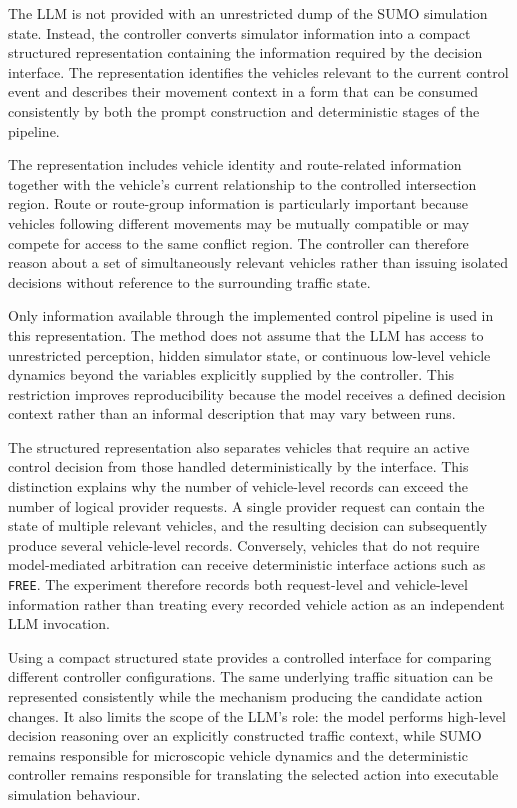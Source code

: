 \documentclass[letterpaper,10pt,conference]{ieeeconf}
\begin{document}
The LLM is not provided with an unrestricted dump of the SUMO simulation state. Instead, the controller converts simulator information into a compact structured representation containing the information required by the decision interface. The representation identifies the vehicles relevant to the current control event and describes their movement context in a form that can be consumed consistently by both the prompt construction and deterministic stages of the pipeline.



The representation includes vehicle identity and route-related information together with the vehicle's current relationship to the controlled intersection region. Route or route-group information is particularly important because vehicles following different movements may be mutually compatible or may compete for access to the same conflict region. The controller can therefore reason about a set of simultaneously relevant vehicles rather than issuing isolated decisions without reference to the surrounding traffic state.



Only information available through the implemented control pipeline is used in this representation. The method does not assume that the LLM has access to unrestricted perception, hidden simulator state, or continuous low-level vehicle dynamics beyond the variables explicitly supplied by the controller. This restriction improves reproducibility because the model receives a defined decision context rather than an informal description that may vary between runs.



The structured representation also separates vehicles that require an active control decision from those handled deterministically by the interface. This distinction explains why the number of vehicle-level records can exceed the number of logical provider requests. A single provider request can contain the state of multiple relevant vehicles, and the resulting decision can subsequently produce several vehicle-level records. Conversely, vehicles that do not require model-mediated arbitration can receive deterministic interface actions such as \texttt{FREE}. The experiment therefore records both request-level and vehicle-level information rather than treating every recorded vehicle action as an independent LLM invocation.



Using a compact structured state provides a controlled interface for comparing different controller configurations. The same underlying traffic situation can be represented consistently while the mechanism producing the candidate action changes. It also limits the scope of the LLM's role: the model performs high-level decision reasoning over an explicitly constructed traffic context, while SUMO remains responsible for microscopic vehicle dynamics and the deterministic controller remains responsible for translating the selected action into executable simulation behaviour.
\end{document}
